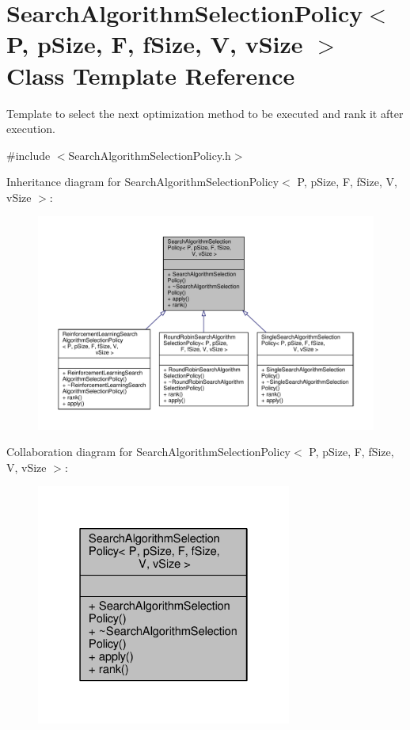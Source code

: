 \hypertarget{classSearchAlgorithmSelectionPolicy}{}\section{Search\+Algorithm\+Selection\+Policy$<$ P, p\+Size, F, f\+Size, V, v\+Size $>$ Class Template Reference}
\label{classSearchAlgorithmSelectionPolicy}


Template to select the next optimization method to be executed and rank it after execution.  




{\ttfamily \#include $<$Search\+Algorithm\+Selection\+Policy.\+h$>$}



Inheritance diagram for Search\+Algorithm\+Selection\+Policy$<$ P, p\+Size, F, f\+Size, V, v\+Size $>$\+:\nopagebreak
\begin{figure}[H]
\begin{center}
\leavevmode
\includegraphics[width=350pt]{classSearchAlgorithmSelectionPolicy__inherit__graph}
\end{center}
\end{figure}


Collaboration diagram for Search\+Algorithm\+Selection\+Policy$<$ P, p\+Size, F, f\+Size, V, v\+Size $>$\+:\nopagebreak
\begin{figure}[H]
\begin{center}
\leavevmode
\includegraphics[width=238pt]{classSearchAlgorithmSelectionPolicy__coll__graph}
\end{center}
\end{figure}

